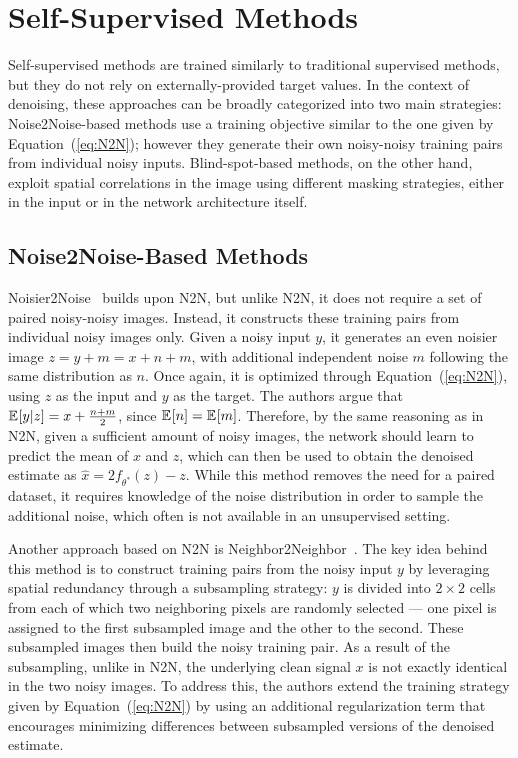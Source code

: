 \section{Self-Supervised Methods}\label{sec:self-supervised}

Self-supervised methods are trained similarly to traditional supervised methods, but they do not rely on externally-provided target values.
In the context of denoising, these approaches can be broadly categorized into two main strategies:
Noise2Noise-based methods use a training objective similar to the one given by Equation~(\ref{eq:N2N}); however they generate their own noisy-noisy training pairs from individual noisy inputs.
Blind-spot-based methods, on the other hand, exploit spatial correlations in the image using different masking strategies, either in the input or in the network architecture itself.

\subsection{Noise2Noise-Based Methods}

Noisier2Noise~\cite{Noisier2Noise} builds upon N2N, but unlike N2N, it does not require a set of paired noisy-noisy images.
Instead, it constructs these training pairs from individual noisy images only.
Given a noisy input $y$, it generates an even noisier image $z = y + m = x + n + m$, with additional independent noise $m$ following the same distribution as $n$.
Once again, it is optimized through Equation~(\ref{eq:N2N}), using $z$ as the input and $y$ as the target.
The authors argue that $\mathbb{E}_{ } [y|z] = x + \frac{n + m}{2}$, since $\mathbb{E}_{ } [n] = \mathbb{E}_{ } [m]$.  %
Therefore, by the same reasoning as in N2N, given a sufficient amount of noisy images, the network should learn to predict the mean of $x$ and $z$, which can then be used to obtain the denoised estimate as $\hat{x} = 2f_{\theta^*}(z) - z$.
While this method removes the need for a paired dataset, it requires knowledge of the noise distribution in order to sample the additional noise, which often is not available in an unsupervised setting.

Another approach based on N2N is Neighbor2Neighbor~\cite{Neighbor2Neighbor}.
The key idea behind this method is to construct training pairs from the noisy input $y$ by leveraging spatial redundancy through a subsampling strategy:
$y$ is divided into $2 \times 2$ cells from each of which two neighboring pixels are randomly selected --- one pixel is assigned to the first subsampled image and the other to the second.
These subsampled images then build the noisy training pair.
As a result of the subsampling, unlike in N2N, the underlying clean signal $x$ is not exactly identical in the two noisy images.
To address this, the authors extend the training strategy given by Equation~(\ref{eq:N2N}) by using an additional regularization term that encourages minimizing differences between subsampled versions of the denoised estimate.

